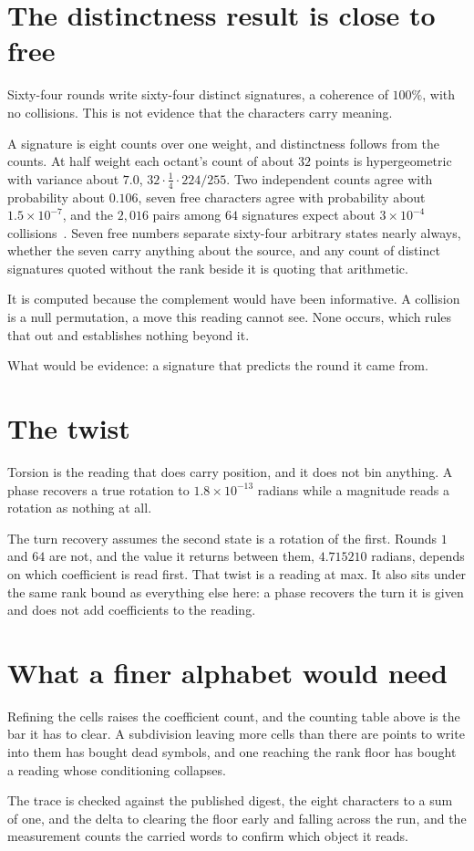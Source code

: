 \section{The distinctness result is close to free}

Sixty-four rounds write sixty-four distinct signatures, a coherence of \(100\%\), with no collisions. This is not evidence that the characters carry meaning.

A signature is eight counts over one weight, and distinctness follows from the counts. At half weight each octant's count of about \(32\) points is hypergeometric with variance about \(7.0\), \(32 \cdot \tfrac14 \cdot 224/255\). Two independent counts agree with probability about \(0.106\), seven free characters agree with probability about \(1.5 \times 10^{-7}\), and the \(2{,}016\) pairs among \(64\) signatures expect about \(3 \times 10^{-4}\) collisions~\cite{src:Feller-1968}. Seven free numbers separate sixty-four arbitrary states nearly always, whether the seven carry anything about the source, and any count of distinct signatures quoted without the rank beside it is quoting that arithmetic.

It is computed because the complement would have been informative. A collision is a null permutation, a move this reading cannot see. None occurs, which rules that out and establishes nothing beyond it.

What would be evidence: a signature that predicts the round it came from.

\section{The twist}

Torsion is the reading that does carry position, and it does not bin anything. A phase recovers a true rotation to \(1.8 \times 10^{-13}\) radians while a magnitude reads a rotation as nothing at all.

The turn recovery assumes the second state is a rotation of the first. Rounds \(1\) and \(64\) are not, and the value it returns between them, \(4.715210\) radians, depends on which coefficient is read first. That twist is a reading at max. It also sits under the same rank bound as everything else here: a phase recovers the turn it is given and does not add coefficients to the reading.

\section{What a finer alphabet would need}

Refining the cells raises the coefficient count, and the counting table above is the bar it has to clear. A subdivision leaving more cells than there are points to write into them has bought dead symbols, and one reaching the rank floor has bought a reading whose conditioning collapses.

The trace is checked against the published digest, the eight characters to a sum of one, and the delta to clearing the floor early and falling across the run, and the measurement counts the carried words to confirm which object it reads.

